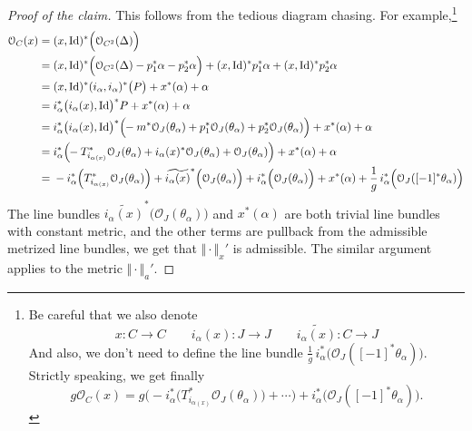 \documentclass[reqno,11pt]{amsart}
\numberwithin{equation}{section}
\theoremstyle{plain}
\theoremstyle{plain}
\numberwithin{equation}{section}
\theoremstyle{remark}
\DeclareMathOperator{\Id}{\operatorname{Id}}
\newcommand{\norm}[1]{\Vert{#1}\Vert}
\begin{document}
\begin{proof}[Proof of the claim]
This follows from the tedious diagram chasing. For example,\footnote{Be careful that we also denote
$$x:C\longrightarrow C \qquad i_{\alpha}(x):J\longrightarrow J \qquad \widetilde{i_{\alpha}(x)}:C\longrightarrow J$$ 
And also, we don't need to define the line bundle $\frac{1}{g} \,i_{\alpha}^* \Big(\mathcal{O}_J([-1]^* \theta_{\alpha}) \Big)$. Strictly speaking, we get finally $$g\mathcal{O}_C(x)=g\bigg(-i_{\alpha}^* \Big(T_{i_{\alpha(x)}}^*\mathcal{O}_{J}(\theta_{\alpha})\Big)+\cdots\bigg)+i_{\alpha}^* \Big(\mathcal{O}_J([-1]^* \theta_{\alpha}) \Big).$$}
\begin{equation*}
\begin{aligned}
 \mathcal{O}_C(x) =\;& (x,\Id)^* \Big(\mathcal{O}_{C^2}(\Delta) \Big) \\ 
  =\;& (x,\Id)^* \Big(\mathcal{O}_{C^2}(\Delta)-p_1^*\alpha-p_2^*\alpha \Big)+(x,\Id)^* p_1^*\alpha+(x,\Id)^* p_2^*\alpha \\ 
  =\;& (x,\Id)^*(i_{\alpha},i_{\alpha})^* \big(P\big) +x^*(\alpha) +\alpha \\ 
  =\;& i_{\alpha}^* \big( i_{\alpha}(x),\Id\!\big)^*P+x^*(\alpha) +\alpha\\ 
  =\;& i_{\alpha}^* \big( i_{\alpha}(x),\Id \!\big)^*\Big(\hspace{-1mm}-m^*\mathcal{O}_{J}(\theta_{\alpha})+p_1^*\mathcal{O}_{J}(\theta_{\alpha})+p_2^*\mathcal{O}_{J}(\theta_{\alpha})\Big)+x^*(\alpha) +\alpha \\ 
  =\;& i_{\alpha}^* \Big(\hspace{-1mm}-T_{i_{\alpha(x)}}^*\mathcal{O}_{J}(\theta_{\alpha})+i_{\alpha}(x)^*\mathcal{O}_{J}(\theta_{\alpha})+\mathcal{O}_{J}(\theta_{\alpha})\Big)+x^*(\alpha) +\alpha \\ 
  =\;& -i_{\alpha}^* \Big(T_{i_{\alpha(x)}}^*\mathcal{O}_{J}(\theta_{\alpha})\Big)+ \widetilde{i_{\alpha}(x)}^*\Big(\mathcal{O}_{J}(\theta_{\alpha})\Big)+i_{\alpha}^* \Big(\mathcal{O}_{J}(\theta_{\alpha})\Big)+x^*(\alpha) +\frac{1}{g} \,i_{\alpha}^* \Big(\mathcal{O}_J([-1]^* \theta_{\alpha}) \Big) \\ 
\end{aligned}
\end{equation*}
The line bundles $\widetilde{i_{\alpha}(x)}^*\Big(\mathcal{O}_{J}(\theta_{\alpha})\Big)$ and $x^*(\alpha)$ are both trivial line bundles with constant metric, and the other terms are pullback from the admissible metrized line bundles, we get that $\norm{\cdot}_x'$ is admissible. The similar argument applies to the metric $\norm{\cdot}_{a}'$.
\end{proof}
\end{document}
